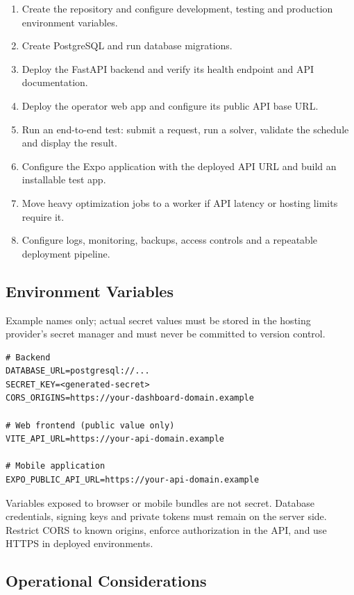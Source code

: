 \documentclass[11pt,a4paper]{article}
\begin{document}
\begin{enumerate}
  \item Create the repository and configure development, testing and production environment variables.
  \item Create PostgreSQL and run database migrations.
  \item Deploy the FastAPI backend and verify its health endpoint and API documentation.
  \item Deploy the operator web app and configure its public API base URL.
  \item Run an end-to-end test: submit a request, run a solver, validate the schedule and display the result.
  \item Configure the Expo application with the deployed API URL and build an installable test app.
  \item Move heavy optimization jobs to a worker if API latency or hosting limits require it.
  \item Configure logs, monitoring, backups, access controls and a repeatable deployment pipeline.
\end{enumerate}

\subsection{Environment Variables}

Example names only; actual secret values must be stored in the hosting provider's secret manager and must never be committed to version control.

\begin{lstlisting}
# Backend
DATABASE_URL=postgresql://...
SECRET_KEY=<generated-secret>
CORS_ORIGINS=https://your-dashboard-domain.example

# Web frontend (public value only)
VITE_API_URL=https://your-api-domain.example

# Mobile application
EXPO_PUBLIC_API_URL=https://your-api-domain.example
\end{lstlisting}

Variables exposed to browser or mobile bundles are not secret. Database credentials, signing keys and private tokens must remain on the server side. Restrict CORS to known origins, enforce authorization in the API, and use HTTPS in deployed environments.

\subsection{Operational Considerations}
\end{document}
